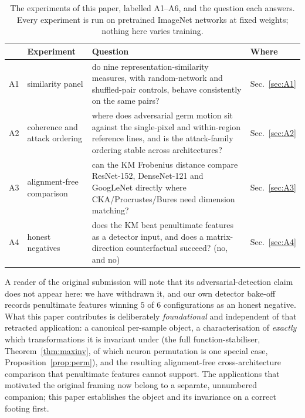 \begin{table}[t]\centering\small
\caption{The experiments of this paper, labelled A1--A6, and the question each answers. Every experiment is run on pretrained ImageNet networks at fixed weights; nothing here varies training.}
\label{tab:a-experiments}
\smallskip
\begin{tabular}{@{}llp{7.4cm}l@{}}\toprule
 & Experiment & Question & Where \\ \midrule
A1 & similarity panel & do nine representation-similarity measures, with random-network and shuffled-pair controls, behave consistently on the same pairs? & Sec.~\ref{sec:A1} \\
A2 & coherence and attack ordering & where does adversarial germ motion sit against the single-pixel and within-region reference lines, and is the attack-family ordering stable across architectures? & Sec.~\ref{sec:A2} \\
A3 & alignment-free comparison & can the KM Frobenius distance compare ResNet-152, DenseNet-121 and GoogLeNet directly where CKA/Procrustes/Bures need dimension matching? & Sec.~\ref{sec:A3} \\
A4 & honest negatives & does the KM beat penultimate features as a detector input, and does a matrix-direction counterfactual succeed? (no, and no) & Sec.~\ref{sec:A4} \\
\bottomrule\end{tabular}\end{table}

A reader of the original submission will note that its
adversarial-detection claim does not appear here: we have withdrawn it,
and our own detector bake-off records penultimate features winning $5$
of $6$ configurations as an honest negative. What this paper contributes
is deliberately \emph{foundational} and independent of that retracted
application: a canonical per-sample object, a characterisation of
\emph{exactly} which transformations it is invariant under (the full
function-stabiliser, Theorem~\ref{thm:maxinv}, of which neuron
permutation is one special case, Proposition~\ref{prop:perm}), and the
resulting alignment-free cross-architecture comparison that penultimate
features cannot support. The applications that motivated the original
framing now belong to a separate, unnumbered companion; this paper
establishes the object and its invariance on a correct footing first.

